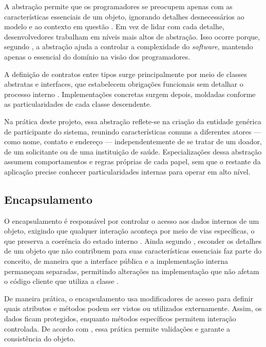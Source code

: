 A abstração permite que os programadores se preocupem apenas com as características essenciais de um objeto, ignorando detalhes desnecessários ao modelo e ao contexto em questão \cite{booch2007}. Em vez de lidar com cada detalhe, desenvolvedores trabalham em níveis mais altos de abstração. Isso ocorre porque, segundo , a abstração ajuda a controlar a complexidade do \textit{software}, mantendo apenas o essencial do domínio na visão dos programadores.

A definição de contratos entre tipos surge principalmente por meio de classes abstratas e interfaces, que estabelecem obrigações funcionais sem detalhar o processo interno \cite{gamma1994}. Implementações concretas surgem depois, moldadas conforme as particularidades de cada classe descendente.

Na prática deste projeto, essa abstração reflete-se na criação da entidade genérica de participante do sistema, reunindo características comuns a diferentes atores --- como nome, contato e endereço --- independentemente de se tratar de um doador, de um solicitante ou de uma instituição de saúde. Especializações dessa abstração assumem comportamentos e regras próprias de cada papel, sem que o restante da aplicação precise conhecer particularidades internas para operar em alto nível.

\subsection{Encapsulamento}

O encapsulamento é responsável por controlar o acesso aos dados internos de um objeto, exigindo que qualquer interação aconteça por meio de vias específicas, o que preserva a coerência do estado interno \cite{sommerville2011}. Ainda segundo , esconder os detalhes de um objeto que não contribuem para suas características essenciais faz parte do conceito, de maneira que a interface pública e a implementação interna permaneçam separadas, permitindo alterações na implementação que não afetam o código cliente que utiliza a classe \cite{sommerville2011}.

De maneira prática, o encapsulamento usa modificadores de acesso para definir quais atributos e métodos podem ser vistos ou utilizados externamente. Assim, os dados ficam protegidos, enquanto métodos específicos permitem interação controlada. De acordo com , essa prática permite validações e garante a consistência do objeto.

